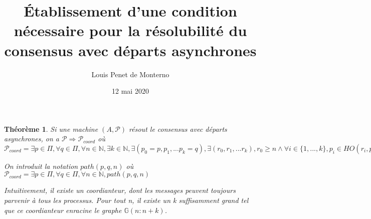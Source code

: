 \documentclass{article}
\title{Établissement d'une condition nécessaire pour la résolubilité du consensus avec départs asynchrones}
\date{12 mai 2020}
\author{Louis Penet de Monterno}
\newtheorem{lemma}{Théorème}
\begin{document}
\maketitle

\begin{lemma}

Si une machine $(A, \mathcal{P})$ résout le consensus avec départs asynchrones, on a
$\mathcal{P} \Rightarrow \mathcal{P}_{coord}$ où $\mathcal{P}_{coord} = \exists p \in \Pi,
\forall q \in \Pi, \forall n \in \mathds{N}, \exists k \in \mathds{N},
\exists (p_0 = p, p_1, ... p_k = q), \exists (r_0, r_1, ... r_k), r_0 \geq n
\wedge \forall i \in \{1, ..., k\}, p_i \in HO(r_i, p_{i-1}) \wedge r_i > r_{i-1}$

On introduit la notation $path(p, q, n)$ où
	$\mathcal{P}_{coord} = \exists p \in \Pi, \forall q \in \Pi, \forall n \in \mathds{N}, path(p, q, n)$ 

Intuitivement, il existe un coordianteur, dont les messages peuvent toujours parvenir à tous les processus.
Pour tout n, il existe un k suffisamment grand tel que ce coordianteur enracine le graphe $\mathds{G}(n:n+k)$.

\end{lemma}
\end{document}
